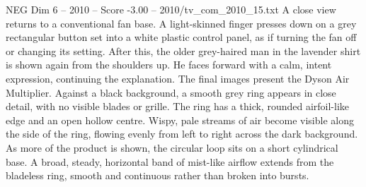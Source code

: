 \begin{textsample}{NEG Dim 6 – 2010 – Score -3.00 – 2010/tv\_com\_2010\_15.txt}
A close view returns to a conventional fan base.
A light-skinned finger presses down on a grey rectangular button set into a white plastic control panel, as if turning the fan off or changing its setting.
After this, the older grey-haired man in the lavender shirt is shown again from the shoulders up.
He faces forward with a calm, intent expression, continuing the explanation.
The final images present the Dyson Air Multiplier.
Against a black background, a smooth grey ring appears in close detail, with no visible blades or grille.
The ring has a thick, rounded airfoil-like edge and an open hollow centre.
Wispy, pale streams of air become visible along the side of the ring, flowing evenly from left to right across the dark background.
As more of the product is shown, the circular loop sits on a short cylindrical base.
A broad, steady, horizontal band of mist-like airflow extends from the bladeless ring, smooth and continuous rather than broken into bursts.

\end{textsample}
